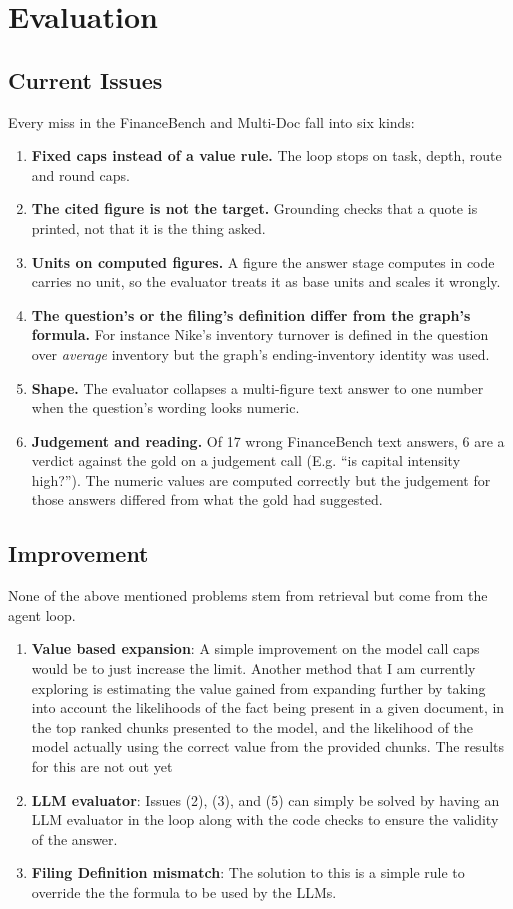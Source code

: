 \section{Evaluation}
\label{sec:next}

\subsection{Current Issues}

Every miss in the FinanceBench and Multi-Doc fall into six kinds:

\begin{enumerate}
\item \textbf{Fixed caps instead of a value rule.} The loop stops on task, depth, route and round caps. 
\item \textbf{The cited figure is not the target.} Grounding checks that a quote is printed, not that it is the thing asked.
\item \textbf{Units on computed figures.} A figure the answer stage computes in code carries no unit, so the evaluator treats it as base units and scales it wrongly.
\item \textbf{The question's or the filing's definition differ from the graph's formula.} For instance Nike's inventory turnover is defined in the question over \emph{average} inventory but the graph's ending-inventory identity was used. 
\item \textbf{Shape.} The evaluator collapses a multi-figure text answer to one number when the question's wording looks numeric.
\item \textbf{Judgement and reading.} Of 17 wrong FinanceBench text answers, 6 are a verdict against the gold on a judgement call (E.g. ``is capital intensity high?''). The numeric values are computed correctly but the judgement for those answers differed from what the gold had suggested.
\end{enumerate}


\subsection{Improvement}

None of the above mentioned problems stem from retrieval but come from the agent loop.
\begin{enumerate}
\item \textbf{Value based expansion}: A simple improvement on the model call caps would be to just increase the limit. Another method that I am currently exploring is estimating the value gained from expanding further by taking into account the likelihoods of the fact being present in a given document, in the top ranked chunks presented to the model, and the likelihood of the model actually using the correct value from the provided chunks. The results for this are not out yet
\item \textbf{LLM evaluator}: Issues (2), (3), and (5) can simply be solved by having an LLM evaluator in the loop along with the code checks to ensure the validity of the answer.
\item \textbf{Filing Definition mismatch}: The solution to this is a simple rule to override the the formula to be used by the LLMs.
\end{enumerate}
